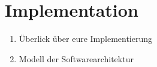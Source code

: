 \section{Implementation}

\begin{enumerate}
	\item Überlick über eure Implementierung
	\item Modell der Softwarearchitektur
\end{enumerate}
